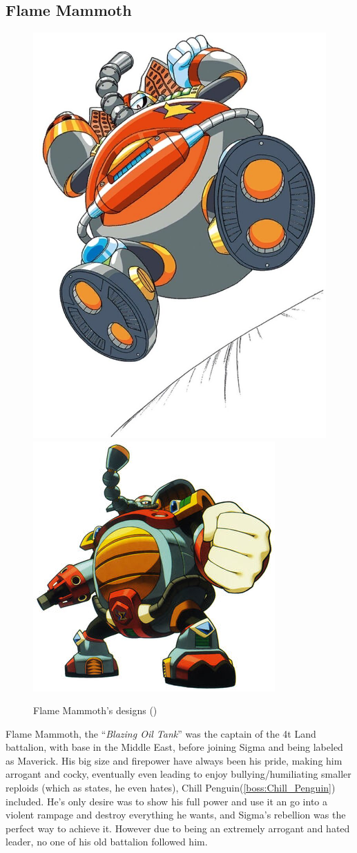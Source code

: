 \subsection{Flame Mammoth}\label{boss:Flame_mammoth}
\begin{figure}[htp]
	\centering
	\includegraphics[width=0.3\linewidth]{figures/X1/Flame_mammoth/Flame_mammoth.jpg}
	\includegraphics[width=0.4\linewidth]{figures/X1/Flame_mammoth/MHXFlameMammoth.jpg}
	\caption{Flame Mammoth's designs (\cite{book:MMX_Complete_art})}
\end{figure}
Flame Mammoth, the ``\textit{Blazing Oil Tank}''\cite{book:MMX_Complete_art} was the captain of the 4t Land battalion, with base in the Middle East, before joining Sigma and being labeled as Maverick. His big size and firepower have always been his pride, making him arrogant and cocky, eventually even leading to enjoy bullying/humiliating smaller reploids (which as \cite{wayback:X_resources} states, he even hates), Chill Penguin(\ref{boss:Chill_Penguin})\cite{wiki:Flame_mammoth} included. He's only desire was to show his full power and use it an go into a violent rampage and destroy everything he wants, and Sigma's rebellion was the perfect way to achieve it. However due to being an extremely arrogant and hated leader, no one of his old battalion followed him\cite{MHX:manual}.

